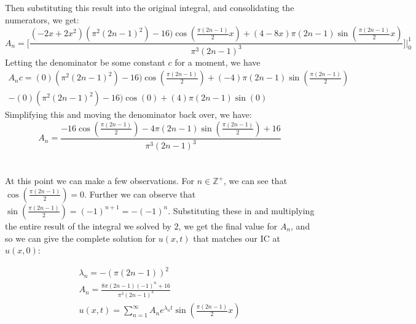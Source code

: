 \documentclass{article}
\begin{document}
Then substituting this result into the original integral, and consolidating the numerators, we get:
\begin{equation}
A_n  = \Big[ \frac{(-2x + 2x^2)(\pi^2(2n-1)^2) - 16)\cos(\frac{\pi(2n-1)}{2}x) + (4-8x)\pi(2n-1)\sin(\frac{\pi(2n-1)}{2}x)}{\pi^3(2n-1)^3} \Big] \Big|_0^1
\end{equation}
Letting the denominator be some constant $c$ for a moment, we have
\begin{multline}
A_n c = (0)(\pi^2(2n-1)^2) - 16)\cos(\frac{\pi(2n-1)}{2}) + (-4)\pi(2n-1)\sin(\frac{\pi(2n-1)}{2}) \\ - (0)(\pi^2(2n-1)^2) - 16)\cos(0) + (4)\pi(2n-1)\sin(0)
\end{multline}
Simplifying this and moving the  denominator back over, we have:
\begin{equation}
A_n = \frac{-16\cos(\frac{\pi(2n-1)}{2}) - 4\pi(2n-1)\sin(\frac{\pi(2n-1)}{2}) + 16}{\pi^3(2n-1)^3}
\end{equation}~\\
\\
At this point we can make a few observations. For $n \in \mathbb{Z}^+$, we can see that $\cos(\frac{\pi(2n-1)}{2}) = 0$. Further we can observe that $\sin(\frac{\pi(2n-1)}{2}) = (-1)^{n+1} = -(-1)^n$. Substituting these in and multiplying the entire result of the integral we solved by $2$, we get the final value for $A_n$, and so we can give the complete solution for $u(x,t)$ that matches our IC at $u(x,0)$:
\begin{tcolorbox}[minipage,colback=white,arc=0pt,outer arc=0pt]
\begin{equation}
\begin{aligned}
\lambda_n = - ( \pi(2n-1))^2\\
A_n = \frac{8\pi(2n-1)(-1)^n + 16}{\pi^3(2n-1)^3}\\
u(x, t) = \sum_{n=1}^{\infty} A_ne^{\lambda_n t}\sin(\frac{\pi(2n-1)}{2}x)
\end{aligned}
\end{equation}
\end{tcolorbox}
\end{document}
